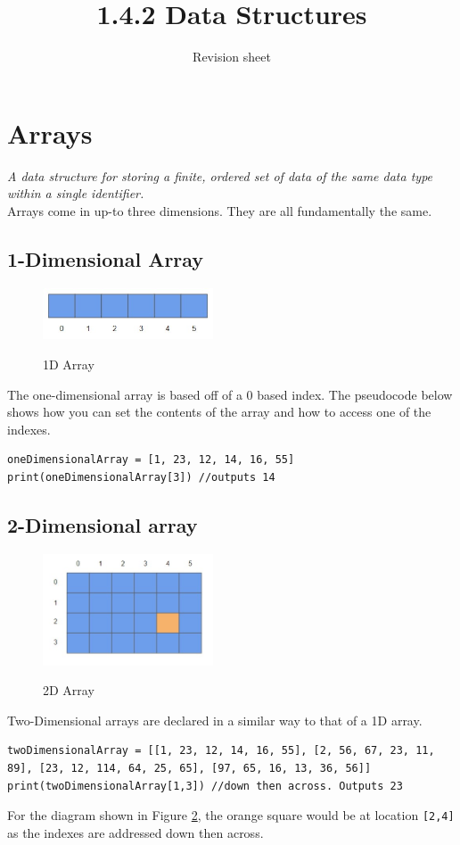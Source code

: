 \documentclass[a4paper,11pt, twocolumn]{article}
\title{1.4.2 Data Structures}
\author{Revision sheet}
\date{}
\begin{document}
\maketitle
\thispagestyle{fancy}

\section{Arrays}
\textit{A data structure for storing a finite, ordered set of data of the same data type within a single identifier.}\\
Arrays come in up-to three dimensions. They are all fundamentally the same.
\subsection{1-Dimensional Array}
\begin{figure}[H]
    \centering
    \includegraphics[width=0.45\textwidth]{1dArray.jpg}
    \label{fig:1dArray}
    \caption{1D Array}
\end{figure}
\noindent The one-dimensional array is based off of a 0 based index. The pseudocode below shows how you can set the contents of the array and how to access one of the indexes.
\begin{Verbatim}[breaklines=true, breakanywhere=true]
oneDimensionalArray = [1, 23, 12, 14, 16, 55]
print(oneDimensionalArray[3]) //outputs 14
\end{Verbatim}
\subsection{2-Dimensional array}
\begin{figure}[H]
    \centering
    \includegraphics[width=0.45\textwidth]{2dArray.jpg}
    \label{fig:2dArray}
    \caption{2D Array}
\end{figure}
\noindent Two-Dimensional arrays are declared in a similar way to that of a 1D array.
\begin{Verbatim}[breaklines=true, breakanywhere=true]
twoDimensionalArray = [[1, 23, 12, 14, 16, 55], [2, 56, 67, 23, 11, 89], [23, 12, 114, 64, 25, 65], [97, 65, 16, 13, 36, 56]]
print(twoDimensionalArray[1,3]) //down then across. Outputs 23
\end{Verbatim}
For the diagram shown in Figure \ref{fig:2dArray}, the orange square would be at location \verb|[2,4]| as the indexes are addressed down then across.
\end{document}
